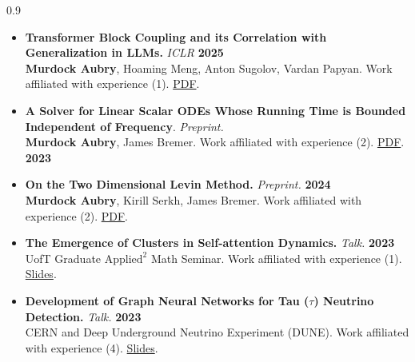 \documentclass{article}
\begin{document}
\begin{spacing}{0.9}
{\begin{itemize}[itemsep=0.1em, parsep=0.2em, topsep=0.1em]

    \item \textbf{Transformer Block Coupling and its Correlation with Generalization in LLMs.} \emph{ICLR}  \hspace{\fill} \textbf{2025}\\
    \textbf{Murdock Aubry}, Hoaming Meng, Anton Sugolov, Vardan Papyan. Work affiliated with experience (1). \href{https://arxiv.org/pdf/2407.07810.pdf}{\color{blue} PDF}.

    \item  \textbf{A Solver for Linear Scalar ODEs Whose Running Time is Bounded Independent of Frequency}. \emph{Preprint.}\\
    \textbf{Murdock Aubry}, James Bremer. Work affiliated with experience (2). \href{https://arxiv.org/pdf/2311.08578}{\color{blue} PDF}. \hspace{\fill} \textbf{2023}

    \item \textbf{On the Two Dimensional Levin Method.} \emph{Preprint.} \hspace{\fill} \textbf{2024}\\
    \textbf{Murdock Aubry}, Kirill Serkh, James Bremer. Work affiliated with experience (2). \href{https://murdockaubry.com/academia/levin2d.pdf}{\color{blue} PDF}.

    \item \textbf{The Emergence of Clusters in Self-attention Dynamics.} \emph{Talk.} \hspace{\fill} \textbf{2023}\\
    UofT Graduate $\text{Applied}^2$ Math Seminar. Work affiliated with experience (1). \href{https://drive.google.com/file/d/1p5r5gWHn2V1RdEuVc5TuneNsZGjzUi1Q/view}{\color{blue} Slides}.

    \item \textbf{Development of Graph Neural Networks for Tau ($\tau$) Neutrino Detection.} \emph{Talk.}\hspace{\fill} \textbf{2023}\\
    CERN and Deep Underground Neutrino Experiment (DUNE). Work affiliated with experience (4). \href{https://murdockaubry.com/academia/dune_slides.pdf}{\color{blue} Slides}.


\end{itemize}}
\end{spacing}
\end{document}
